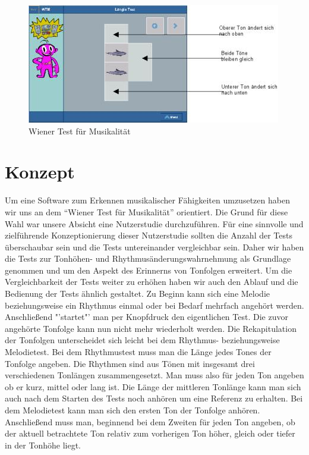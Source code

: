 \documentclass{acm_proc_article-sp}
\begin{document}
\begin{figure}[H]
\centering
\includegraphics[width=1.0\linewidth]{Abbildungen/wienertest.jpg}
\caption{Wiener Test für Musikalität}
\label{pic:wienertest}
\end{figure}

\section{Konzept}
Um eine Software zum Erkennen musikalischer Fähigkeiten umzusetzen haben wir uns an dem "`Wiener Test für Musikalität"' orientiert.
Die Grund für diese Wahl war unsere Absicht eine Nutzerstudie durchzuführen. Für eine sinnvolle und zielführende Konzeptionierung dieser Nutzerstudie sollten die Anzahl der Tests überschaubar sein und die Tests untereinander vergleichbar sein.
Daher wir haben die Tests zur Tonhöhen- und Rhythmusänderungswahrnehmung als Grundlage genommen und um den Aspekt des Erinnerns von Tonfolgen erweitert.
Um die Vergleichbarkeit der Tests weiter zu erhöhen haben wir auch den Ablauf und die Bedienung der Tests ähnlich gestaltet.
Zu Beginn kann sich eine Melodie beziehungsweise ein Rhythmus einmal oder bei Bedarf mehrfach angehört werden. Anschließend "'startet"' man per Knopfdruck den eigentlichen Test. Die zuvor angehörte Tonfolge kann nun nicht mehr wiederholt werden. Die Rekapitulation der Tonfolgen unterscheidet sich leicht bei dem Rhythmus- beziehungsweise Melodietest. Bei dem Rhythmustest muss man die Länge jedes Tones der Tonfolge angeben. Die Rhythmen sind aus Tönen mit insgesamt drei verschiedenen Tonlängen zusammengesetzt. Man muss also für jeden Ton angeben ob er kurz, mittel oder lang ist. Die Länge der mittleren Tonlänge kann man sich auch nach dem Starten des Tests noch anhören um eine Referenz zu erhalten.
Bei dem Melodietest kann man sich den ersten Ton der Tonfolge anhören. Anschließend muss man, beginnend bei dem Zweiten für jeden Ton angeben, ob der aktuell betrachtete Ton relativ zum vorherigen Ton höher, gleich oder tiefer in der Tonhöhe liegt.
\end{document}
